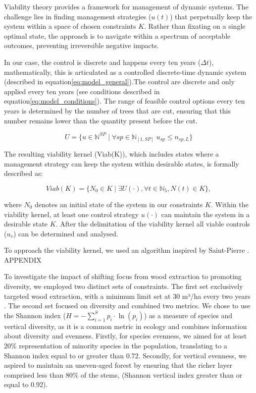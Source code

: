 \documentclass{article}
\begin{document}
Viability theory provides a framework for management of dynamic systems. The challenge lies in finding management strategies (\(u(t)\)) that perpetually keep the system within a space of chosen constraints $K$. Rather than fixating on a single optimal state, the approach is to navigate within a spectrum of acceptable outcomes, preventing irreversible negative impacts.

In our case, the control is discrete and happens every ten years ($\Delta t$), mathematically, this is articulated as a controlled discrete-time dynamic system (described in equation\eqref{eq:model_general}).The control are discrete and only applied every ten years (see conditions described in equation\eqref{eq:model_conditions}). The range of feasible control options every ten years is determined by the number of trees that are cut, ensuring that this number remains lower than the quantity present before the cut.

\begin{equation}
     U = \{u \in \mathbb{N}^{SP} \mid \forall sp \in \mathbb{N}_{[1,SP]} \; u_{sp} \leq n_{sp,L}\}
\end{equation}

The resulting viability kernel (Viab(K)), which includes states where a management strategy can keep the system within desirable states, is formally described as:

\begin{equation}
    Viab(K) = \{N_0 \in K \mid\exists U(\cdot), \forall t \in \mathbb{N}_5, N(t) \in K\},
\end{equation}

where \(N_0\) denotes an initial state of the system in our constraints $K$. Within the viability kernel, at least one control strategy $u(\cdot)$ can maintain the system in a desirable state $K$. After the delimitation of the viability kernel all viable controls (\(u_v\)) can be determined and analysed.

To approach the viability kernel, we used an algorithm inspired by Saint-Pierre \autocite{saint-pierreApproximationViabilityKernel1994}. APPENDIX

To investigate the impact of shifting focus from wood extraction to promoting diversity, we employed two distinct sets of constraints. The first set exclusively targeted wood extraction, with a minimum limit set at 30 m³/ha every two years \autocite{IGN}. The second set focused on diversity and combined two metrics. We chose to use the Shannon index ($H = -\sum_{i=1}^{S} p_i \cdot \ln(p_i)$) as a measure of species and vertical diversity, as it is a common metric in ecology and combines information about diversity and evenness. Firstly, for species evenness, we aimed for at least 20\% representation of minority species in the population, translating to a Shannon index equal to or greater than 0.72. Secondly, for vertical evenness, we aspired to maintain an uneven-aged forest by ensuring that the richer layer comprised less than 80\% of the stems, (Shannon vertical index greater than or equal to 0.92).
\\
\end{document}
